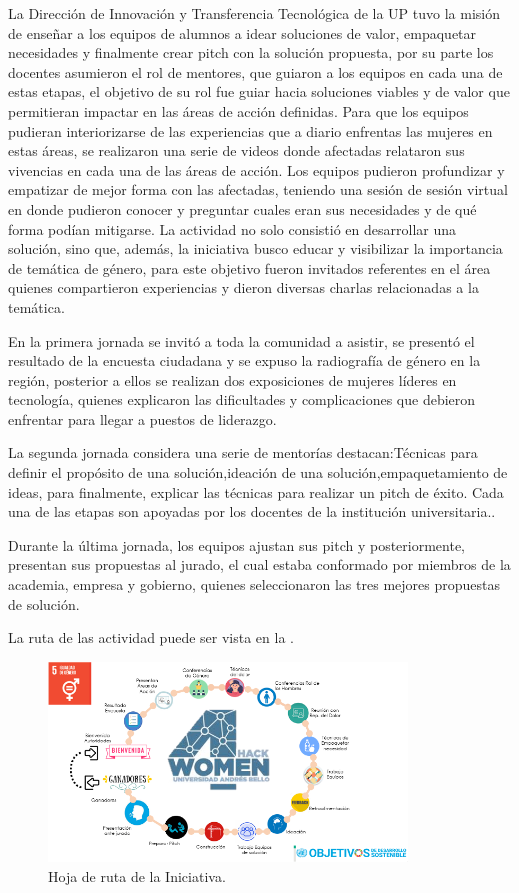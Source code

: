 \documentclass[spanish]{textolivre}
\begin{document}
La Dirección de Innovación y Transferencia Tecnológica de la UP tuvo la misión de enseñar a los equipos de alumnos a idear soluciones de valor, empaquetar necesidades y finalmente crear pitch con la solución propuesta, por su parte los docentes asumieron el rol de mentores, que guiaron a los equipos en cada una de estas etapas, el objetivo de su rol fue guiar hacia soluciones viables y de valor que permitieran impactar en las áreas de acción definidas. Para que los equipos pudieran interiorizarse de las experiencias que a diario enfrentas las mujeres en estas áreas, se realizaron una serie de videos donde afectadas relataron sus vivencias en cada una de las áreas de acción. Los equipos pudieron profundizar y empatizar de mejor forma con las afectadas, teniendo una sesión de sesión virtual en donde pudieron conocer y preguntar cuales eran sus necesidades y de qué forma podían mitigarse.
La actividad no solo consistió en desarrollar una solución, sino que, además, la iniciativa busco educar y visibilizar la importancia de temática de género, para este objetivo fueron invitados referentes en el área quienes compartieron experiencias y dieron diversas charlas relacionadas a la temática.

En la primera jornada se invitó a toda la comunidad a asistir, se presentó el resultado de la encuesta ciudadana y se expuso la radiografía de género en la región, posterior a ellos se realizan dos exposiciones de mujeres líderes en tecnología, quienes explicaron las dificultades y complicaciones que debieron enfrentar para llegar a puestos de liderazgo.

La segunda jornada considera una serie de mentorías destacan:Técnicas para definir el propósito de una solución,ideación de una solución,empaquetamiento de ideas, para finalmente, explicar las técnicas para realizar un pitch de éxito. Cada una de las etapas son apoyadas por los docentes de la institución universitaria.. 

Durante la última jornada, los equipos ajustan sus pitch y posteriormente, presentan sus propuestas al jurado, el cual estaba conformado por miembros de la academia, empresa y gobierno, quienes seleccionaron las tres mejores propuestas de solución.

La ruta de las actividad puede ser vista en la .

\begin{figure}[h!]
 \centering
 \includegraphics[width=0.85\textwidth]{images/figura4.png}
 \caption{Hoja de ruta de la Iniciativa.}
 \label{fig04}
\end{figure}
\end{document}
